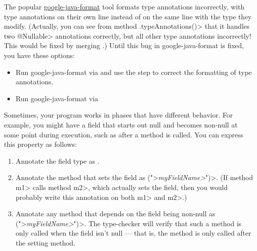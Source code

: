The popular
\href{https://github.com/google/google-java-format}{google-java-format}
tool formats type annotations incorrectly, with type annotations on their
own line instead of on the same line with the type they modify.  (Actually,
you can see from method \<.typeAnnotations()> that
it handles two \<@Nullable> annotations correctly, but all other type
annotations incorrectly!  This would be fixed by merging
.)
Until this bug in google-java-format is fixed, you have these options:
\begin{itemize}
\item
  Run google-java-format via
   and use the
  step to correct the formatting of type annotations.
\item
  Run google-java-format via 
\end{itemize}





Sometimes, your program works in phases that have different behavior.  For
example, you might have a field that starts out null and becomes non-null
at some point during execution, such as after a method is called.  You can
express this property as follows:

\begin{enumerate}
\item
Annotate the field type as .
\item
Annotate the method that sets the field as \<(">\emph{\<myFieldName>}\<")>.
(If method \<m1> calls method \<m2>, which actually sets the field, then
you would probably write this annotation on both \<m1> and \<m2>.)
\item
Annotate any method that depends on the field being non-null as
\<(">\emph{\<myFieldName>}\<")>.
The type-checker will verify that such a method is only called when the
field isn't null --- that is, the method is only called after the setting
method.
\end{enumerate}

